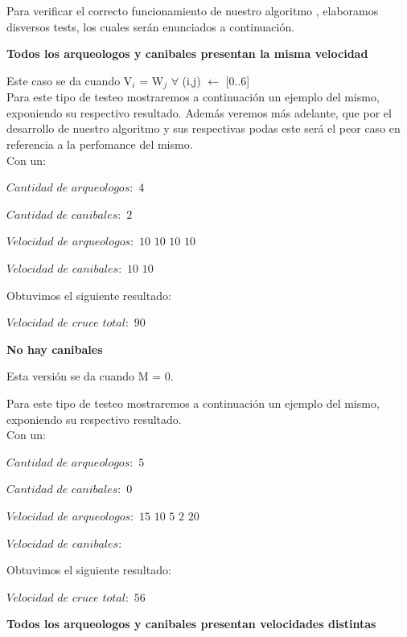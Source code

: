 \indent Para verificar el correcto funcionamiento de nuestro algoritmo , elaboramos disversos tests,
los cuales ser\'an enunciados a continuaci\'on.\\

\begin{center}
 \textbf{Todos los arqueologos y canibales presentan la misma velocidad}
\end{center}

Este caso se da cuando V$_{i}$ = W$_{j}$ $\forall$ (i,j)  $\gets$ [0..6] \\

 Para este tipo de testeo mostraremos a continuaci\'on un ejemplo del mismo, exponiendo su respectivo resultado. Adem\'as veremos m\'as adelante, que por el desarrollo de nuestro algoritmo y sus respectivas podas este ser\'a el peor caso en referencia a la perfomance del mismo.\\
 
 Con un:
 
$Cantidad$ $de$ $arqueologos:$ $4 $

$Cantidad$ $de$ $canibales:$ $2 $ 

$Velocidad$ $de$ $arqueologos:$ $10$ $10$ $10$ $10$

$Velocidad$ $de$ $canibales:$ $10$ $10 $

  Obtuvimos el siguiente resultado:

$Velocidad$ $de$ $cruce$ $total: $ $90$\\



 \begin{center}
 \textbf{No hay canibales}
\end{center}

Esta versi\'on se da cuando M = 0. 

Para este tipo de testeo mostraremos a continuaci\'on un ejemplo del mismo, exponiendo su respectivo resultado.\\

 Con un:

$Cantidad$ $de$ $arqueologos:$ $5 $  

$Cantidad$ $de$ $canibales:$ $0 $ 

$Velocidad$ $de$ $arqueologos:$ $15$ $10$ $5$ $2$ $20$ 

$Velocidad$ $de$ $canibales: $  

  Obtuvimos el siguiente resultado:

$Velocidad$ $de$ $cruce$ $total: $ $56$


\begin{center}
 \textbf{Todos los arqueologos y canibales presentan velocidades distintas}
\end{center}

